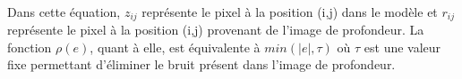\paragraph{}
Dans cette équation, $z_{ij}$ représente le pixel à la position (i,j) dans le modèle et $r_{ij}$ représente le pixel à la position (i,j)
provenant de l'image de profondeur. La fonction $\rho(e)$, quant à elle, est équivalente à $min(|e|,\tau)$ où $\tau$ est une valeur fixe permettant d'éliminer le bruit présent dans l'image de profondeur.





